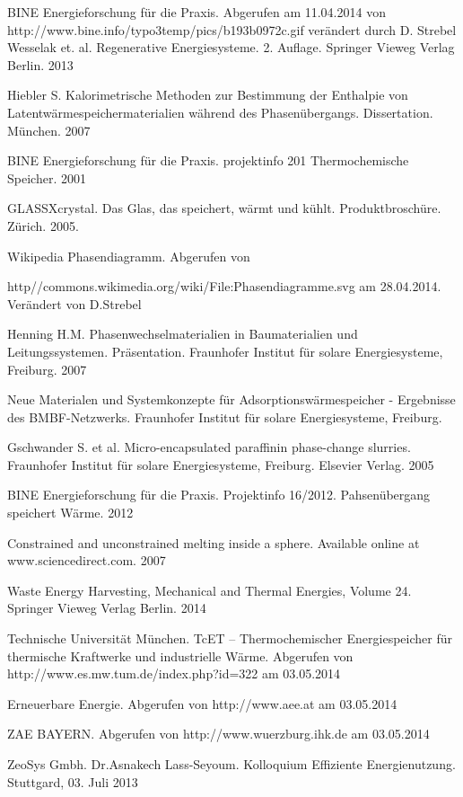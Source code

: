 \documentclass[11pt,a4paper]{scrartcl}
\begin{document}
\begin{thebibliography}{99}
	BINE Energieforschung für die Praxis. Abgerufen am 11.04.2014 von http://www.bine.info/typo3temp/pics/b193b0972c.gif verändert durch D. Strebel
	Wesselak et. al. Regenerative Energiesysteme. 2. Auflage.
	Springer Vieweg Verlag Berlin. 2013
	
	 Hiebler S. Kalorimetrische Methoden zur Bestimmung der
	Enthalpie von Latentwärmespeichermaterialien während des Phasenübergangs. Dissertation.
	München. 2007
	
	 BINE Energieforschung für die Praxis. projektinfo 2\/01
	Thermochemische Speicher. 2001
	
	 GLASSX\circledR crystal. Das Glas, das speichert, wärmt und
	kühlt. Produktbroschüre. Zürich. 2005.
	 
	 Wikipedia Phasendiagramm. 
	Abgerufen von
	
	http//commons.wikimedia.org/wiki/File:Phasendiagramme.svg am 28.04.2014.
	Verändert von D.Strebel
	
	 Henning H.M. Phasenwechselmaterialien in Baumaterialien und
	Leitungssystemen. Präsentation. Fraunhofer Institut für solare Energiesysteme,
	Freiburg. 2007
	
	 Neue Materialen und Systemkonzepte für Adsorptionswärmespeicher - Ergebnisse des BMBF-Netzwerks.  Fraunhofer Institut für solare Energiesysteme,
		Freiburg.
	
	 Gschwander S. et al. Micro-encapsulated paraffinin
	phase-change slurries. Fraunhofer Institut für solare Energiesysteme,
	Freiburg. Elsevier Verlag. 2005

	 BINE Energieforschung für die Praxis. Projektinfo 16/2012.
	Pahsenübergang speichert Wärme. 2012
		
	 Constrained and unconstrained melting inside a sphere. Available online at www.sciencedirect.com. 2007
	
	 Waste Energy Harvesting, Mechanical and Thermal Energies, Volume 24.
		Springer Vieweg Verlag Berlin. 2014
		
	 Technische Universität München. TcET – Thermochemischer Energiespeicher für thermische Kraftwerke und industrielle Wärme.
	Abgerufen von http://www.es.mw.tum.de/index.php?id=322 am 03.05.2014		
		
	
	 Erneuerbare Energie. 
	Abgerufen von http://www.aee.at am 03.05.2014
	
	
     ZAE BAYERN. Abgerufen von http://www.wuerzburg.ihk.de am 03.05.2014	%
    
     ZeoSys Gmbh. Dr.Asnakech Lass-Seyoum. Kolloquium Effiziente Energienutzung. Stuttgard, 03. Juli 2013
	
\end{thebibliography}
\end{document}
